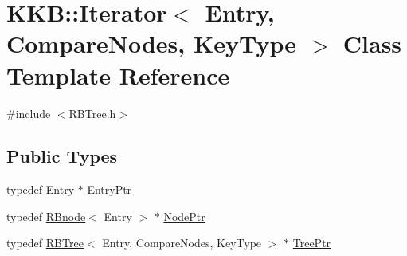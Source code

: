 \hypertarget{class_k_k_b_1_1_iterator}{}\section{K\+KB\+:\+:Iterator$<$ Entry, Compare\+Nodes, Key\+Type $>$ Class Template Reference}
\label{class_k_k_b_1_1_iterator}


{\ttfamily \#include $<$R\+B\+Tree.\+h$>$}

\subsection*{Public Types}
\begin{DoxyCompactItemize}
\item 
typedef Entry $\ast$ \hyperlink{class_k_k_b_1_1_iterator_a5ef3b16d0bdf3de41ca114c2eebd6e1e}{Entry\+Ptr}
\item 
typedef \hyperlink{class_k_k_b_1_1_r_bnode}{R\+Bnode}$<$ Entry $>$ $\ast$ \hyperlink{class_k_k_b_1_1_iterator_aa840c0dd987e462281441126f7f36f19}{Node\+Ptr}
\item 
typedef \hyperlink{class_k_k_b_1_1_r_b_tree}{R\+B\+Tree}$<$ Entry, Compare\+Nodes, Key\+Type $>$ $\ast$ \hyperlink{class_k_k_b_1_1_iterator_a18f7c2f566b76a14bb6306a928b7b194}{Tree\+Ptr}
\end{DoxyCompactItemize}

